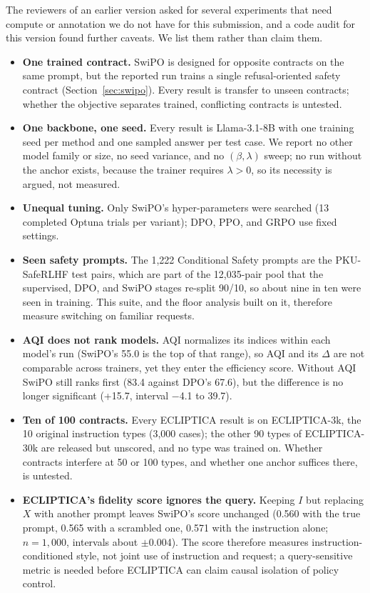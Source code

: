 \documentclass[letterpaper]{article} %
\begin{document}
The reviewers of an earlier version asked for several experiments that need compute or annotation we do not have for this submission, and a code audit for this version found further caveats. We list them rather than claim them.
\begin{itemize}
    \item \textbf{One trained contract.} SwiPO is designed for opposite contracts on the same prompt, but the reported run trains a single refusal-oriented safety contract (Section~\ref{sec:swipo}). Every result is transfer to unseen contracts; whether the objective separates trained, conflicting contracts is untested.
    \item \textbf{One backbone, one seed.} Every result is Llama-3.1-8B with one training seed per method and one sampled answer per test case. We report no other model family or size, no seed variance, and no $(\beta,\lambda)$ sweep; no run without the anchor exists, because the trainer requires $\lambda>0$, so its necessity is argued, not measured.
    \item \textbf{Unequal tuning.} Only SwiPO's hyper-parameters were searched (13 completed Optuna trials per variant); DPO, PPO, and GRPO use fixed settings.
    \item \textbf{Seen safety prompts.} The 1,222 Conditional Safety prompts are the PKU-SafeRLHF test pairs, which are part of the 12,035-pair pool that the supervised, DPO, and SwiPO stages re-split 90/10, so about nine in ten were seen in training. This suite, and the floor analysis built on it, therefore measure switching on familiar requests.
    \item \textbf{AQI does not rank models.} AQI normalizes its indices within each model's run (SwiPO's 55.0 is the top of that range), so AQI and its $\Delta$ are not comparable across trainers, yet they enter the efficiency score. Without AQI SwiPO still ranks first (83.4 against DPO's 67.6), but the difference is no longer significant (+15.7, interval $-$4.1 to 39.7).
    \item \textbf{Ten of 100 contracts.} Every ECLIPTICA result is on ECLIPTICA-3k, the 10 original instruction types (3,000 cases); the other 90 types of ECLIPTICA-30k are released but unscored, and no type was trained on. Whether contracts interfere at 50 or 100 types, and whether one anchor suffices there, is untested.
    \item \textbf{ECLIPTICA's fidelity score ignores the query.} Keeping $I$ but replacing $X$ with another prompt leaves SwiPO's score unchanged (0.560 with the true prompt, 0.565 with a scrambled one, 0.571 with the instruction alone; $n=1{,}000$, intervals about $\pm$0.004). The score therefore measures instruction-conditioned style, not joint use of instruction and request; a query-sensitive metric is needed before ECLIPTICA can claim causal isolation of policy control.

\end{itemize}
\end{document}
